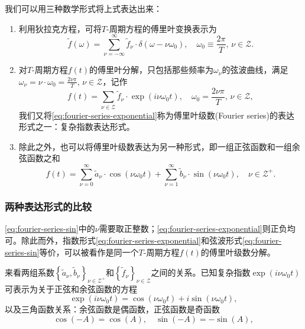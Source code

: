 我们可以用三种数学形式将上式表达出来：
\begin{enumerate}
  \item 利用狄拉克方程，可将$T$-周期方程的傅里叶变换表示为
  \begin{equation}
    \label{eq:fourier-series-dirac}
    \tilde{f}(\omega) = \sum_{\nu = - \infty}^{\infty}
    \tilde{f}_{\nu} \cdot \delta \left( \omega - \nu \omega_{0} \right), \quad \omega_{0} \equiv \frac{2 \pi}{T}, \, \nu \in \mathcal{Z}.
  \end{equation}
  \item 对$T$-周期方程$f(t)$的傅里叶分解，只包括那些频率为$\omega_{\nu}$的弦波曲线，满足$\omega_{\nu} = \nu \cdot \omega_{0} = \frac{2 \nu \pi}{T}, \, \nu \in \mathcal{Z}$，记作
  \begin{equation}
    \label{eq:fourier-series-exponential}
    f(t) = \sum_{\nu \in \mathcal{Z}} \tilde{f}_{\nu} \cdot \exp \left( i \nu \omega_{0} t \right), \quad \omega_{0} = \frac{2 \nu \pi}{T}, \, \nu \in \mathcal{Z},
  \end{equation}
  我们又将\eqref{eq:fourier-series-exponential}称为傅里叶级数(Fourier series)的表达形式之一：复杂指数表达形式。

  \item 除此之外，也可以将傅里叶级数表达为另一种形式，即一组正弦函数和一组余弦函数之和
  \begin{equation}
    \label{eq:fourier-series-sin}
    f(t) = \sum_{\nu = 0}^{\infty} \tilde{a}_{\nu} \cdot \cos \left( \nu \omega_{0} t \right)
    + \sum_{\nu = 1}^{\infty} \tilde{b}_{\nu} \cdot \sin \left( \nu \omega_{0} t \right), \quad \nu \in \mathcal{Z}^{+}.
  \end{equation}
\end{enumerate}

\subsubsection{两种表达形式的比较}
  \eqref{eq:fourier-series-sin}中的$\nu$需要取正整数；\eqref{eq:fourier-series-exponential}则正负均可。除此而外，指数形式\eqref{eq:fourier-series-exponential}和弦波形式\eqref{eq:fourier-series-sin}等价，可以被看作是同一个$T$-周期方程$f(t)$的傅里叶级数分解。

来看两组系数$\left\{ \tilde{a}_{\nu}, \tilde{b}_{\nu} \right\}_{\nu \in \mathcal{Z}^{+}}$和$\left\{ \tilde{f}_{\nu} \right\}_{\nu \in \mathcal{Z}}$之间的关系。已知复杂指数$\exp \left( i \nu \omega_{0} t \right)$可表示为关于正弦和余弦函数的方程
\begin{equation}
  \label{eq:fourier-series-complex-expo}
  \exp \left( i \nu \omega_{0} t \right) = \cos \left( \nu \omega_{0} t \right) + i \sin \left( \nu \omega_{0} t \right),
\end{equation}
以及三角函数关系：余弦函数是偶函数，正弦函数是奇函数
\begin{equation}
  \label{eq:fourier-cos-even-sin-odd}
  \cos \left( - A \right) = \cos \left( A \right), \quad \sin \left( - A \right) = - \sin \left( A \right),
\end{equation}

